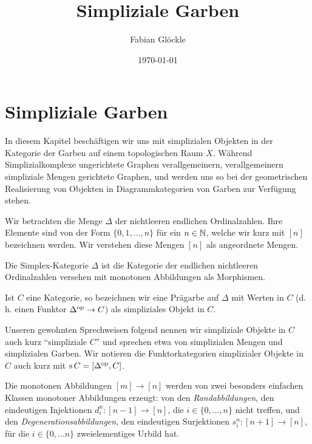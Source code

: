 



\title{Simpliziale Garben}
\author{Fabian Glöckle}
\date{\today}

\chapter{Simpliziale Garben}

In diesem Kapitel beschäftigen wir uns mit simplizialen Objekten in
der Kategorie der Garben auf einem topologischen Raum $X$. Während
Simplizialkomplexe ungerichtete Graphen verallgemeinern,
verallgemeinern simpliziale Mengen gerichtete Graphen, und werden uns
so bei der geometrischen Realisierung von Objekten in
Diagrammkategorien von Garben zur Verfügung stehen.

Wir betrachten die Menge $\Delta$ der nichtleeren endlichen
Ordinalzahlen. Ihre Elemente sind von der Form $\{0, 1, \dots, n\}$
für ein $n \in \mathbb{N}$, welche wir kurz mit $[n]$ bezeichnen werden. Wir
verstehen diese Mengen $[n]$ als angeordnete Mengen.

\begin{defn}
  Die Simplex-Kategorie $\Delta$ ist die Kategorie der endlichen
  nichtleeren Ordinalzahlen versehen mit monotonen Abbildungen als
  Morphismen.

  Ist $C$ eine Kategorie, so bezeichnen wir eine Prägarbe auf $\Delta$
  mit Werten in $C$ (d. h. einen Funktor $\Delta^\mathrm{op} \to C$) als
  simpliziales Objekt in $C$.
\end{defn}

Unseren gewohnten Sprechweisen folgend nennen wir simpliziale Objekte
in $C$ auch kurz ``simpliziale $C$'' und sprechen etwa von
simplizialen Mengen und simplizialen Garben. Wir notieren die
Funktorkategorien simplizialer Objekte in $C$ auch kurz mit $\operatorname{s} C =
[\Delta^\mathrm{op}, C]$.

Die monotonen Abbildungen $[m] \to [n]$ werden von zwei besonders
einfachen Klassen monotoner Abbildungen erzeugt: von den
\emph{Randabbildungen}, den eindeutigen Injektionen $d_i^n: [n - 1] \to [n]$,
die $i \in \{0, \dots, n\}$ nicht treffen, und den
\emph{Degenerationsabbildungen}, den eindeutigen Surjektionen $s_i^n: [n +
1] \to [n]$, für die $i \in \{0, \dots n\}$ zweielementiges Urbild
hat.

